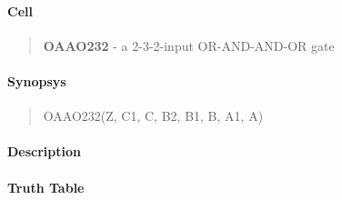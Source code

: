 \label{OAAO232}
\paragraph{Cell}
\begin{quote}
    \textbf{OAAO232} - a 2-3-2-input OR-AND-AND-OR gate
\end{quote}

\paragraph{Synopsys}
\begin{quote}
    OAAO232(Z, C1, C, B2, B1, B, A1, A)
\end{quote}

\paragraph{Description}

%

\paragraph{Truth Table}
%

